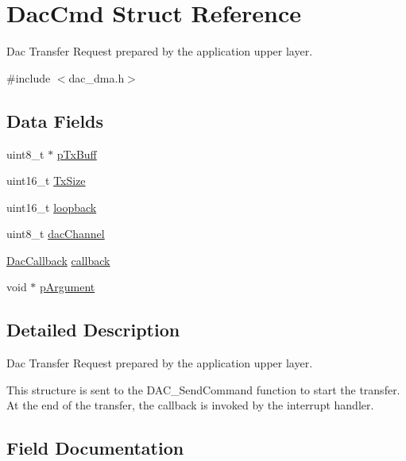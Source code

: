 \hypertarget{structDacCmd}{}\section{Dac\+Cmd Struct Reference}
\label{structDacCmd}


Dac Transfer Request prepared by the application upper layer.  




{\ttfamily \#include $<$dac\+\_\+dma.\+h$>$}

\subsection*{Data Fields}
\begin{DoxyCompactItemize}
\item 
uint8\+\_\+t $\ast$ \mbox{\hyperlink{structDacCmd_a0ada14dbfd86905a3723c5a9b3a76b84}{p\+Tx\+Buff}}
\item 
uint16\+\_\+t \mbox{\hyperlink{structDacCmd_a961247bd9e0876a0ff5d6e8bcb31fa73}{Tx\+Size}}
\item 
uint16\+\_\+t \mbox{\hyperlink{structDacCmd_aeb652d588aef33cfd8a1cd4d8de7ab2e}{loopback}}
\item 
uint8\+\_\+t \mbox{\hyperlink{structDacCmd_ad2777b72bf9a239403de59ce63cc27e0}{dac\+Channel}}
\item 
\mbox{\hyperlink{dac__dma_8h_af9a1c1e4392c0aa064b7f6b6dfd0d75e}{Dac\+Callback}} \mbox{\hyperlink{structDacCmd_a756b099b39bdd8f68ff23d861a1ca31e}{callback}}
\item 
void $\ast$ \mbox{\hyperlink{structDacCmd_a6b9d2d498beb9a7ccacb0ee06efc2931}{p\+Argument}}
\end{DoxyCompactItemize}


\subsection{Detailed Description}
Dac Transfer Request prepared by the application upper layer. 

This structure is sent to the D\+A\+C\+\_\+\+Send\+Command function to start the transfer. At the end of the transfer, the callback is invoked by the interrupt handler. 

\subsection{Field Documentation}
\mbox{\label{structDacCmd_a756b099b39bdd8f68ff23d861a1ca31e}} 

